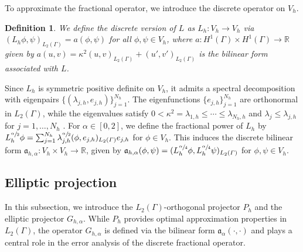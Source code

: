 \documentclass[numbers,webpdf]{ima-authoring-template}%
\theoremstyle{thmstyletwo}%
\newtheorem{definition}{Definition}
\numberwithin{equation}{section}
\begin{document}
To approximate the fractional operator, we introduce the discrete operator on $V_h$.
\begin{definition}
   We define the discrete version of $L$ as $L_h:V_h\to V_h$ via $(L_h\phi,\psi)_{L_2(\Gamma)} = a(\phi, \psi)$ for all $\phi,\psi\in V_h$, where $a:H^1(\Gamma)\times H^1(\Gamma)\to\mathbb{R}$ given by $a(u,v)= \kappa^2(u,v)_{L_2(\Gamma)} + (u',v')_{L_2(\Gamma)}$ is the bilinear form associated with $L$.
\end{definition}
Since $L_h$ is symmetric positive definite on $V_h$, it admits a spectral decomposition with eigenpairs $\{(\lambda_{j,h},e_{j,h})\}_{j=1}^{N_h}$. The eigenfunctions $\{e_{j,h}\}_{j=1}^{N_h}$ are orthonormal in $L_2(\Gamma)$, while the eigenvalues satisfy $0<\kappa^2=\lambda_{1,h}\leq\cdots\leq\lambda_{N_h,h}$ and $\lambda_j\leq\lambda_{j,h}$ for $j=1,\dots,N_h$ \cite[Section~6.3]{bolin2023regularity}. For $\alpha\in[0,2]$, we define the fractional power of $L_h$ by $L_h^{\sfrac{\alpha}{2}}\phi=\sum_{j=1}^{N_h}\lambda_{j,h}^{\sfrac{\alpha}{2}}(\phi,e_{j,h})_{L_2({\mit\varGamma})}e_{j,h}$ for $\phi\in V_h$. This induces the discrete bilinear form $\mathfrak{a}_{h,\alpha}:V_h\times V_h\to\mathbb{R}$, given by $\mathfrak{a}_{h,\alpha}(\phi,\psi)=(L_h^{\sfrac{\alpha}{4}}\phi,L_h^{\sfrac{\alpha}{4}}\psi)_{L_2({\mit\varGamma})}$ for $\phi,\psi\in V_h$.
\subsection{Elliptic projection}
In this subsection, we introduce the $L_2(\Gamma)$-orthogonal projector $P_h$ and the elliptic projector $G_{h,\alpha}$. While $P_h$ provides optimal approximation properties in $L_2(\Gamma)$, the operator $G_{h,\alpha}$ is defined via the bilinear form $\mathfrak{a}_{\alpha}(\cdot,\cdot)$ and plays a central role in the error analysis of the discrete fractional operator.
\end{document}
